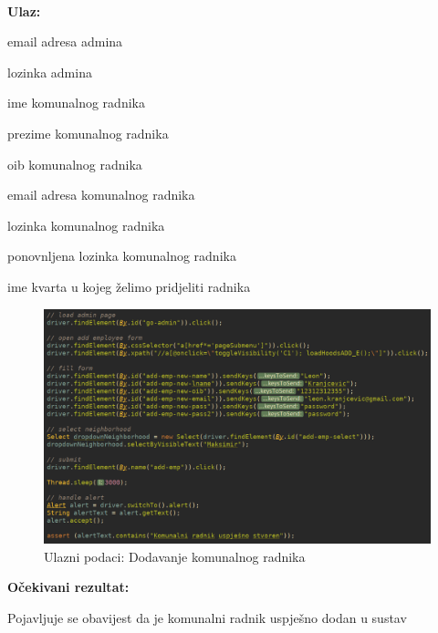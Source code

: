 			
			
			\noindent {}
			
			\
			
			\noindent \textbf{Ulaz:}
			
			\begin{packed_enum}
				\item email adresa admina
				\item lozinka admina
				\item ime komunalnog radnika
				\item prezime komunalnog radnika	
				\item oib komunalnog radnika		
				\item email adresa komunalnog radnika
				\item lozinka komunalnog radnika
				\item ponovnljena lozinka komunalnog radnika
				\item ime kvarta u kojeg želimo pridjeliti radnika
				
			\end{packed_enum}

			\begin{figure}[H]
					\includegraphics[scale=0.57]{figures/admin-add-emp-code.PNG}
					\centering
					\caption{Ulazni podaci: Dodavanje komunalnog radnika}
					\label{fig:Dodavanje komunalnog radnika}
				\end{figure}	
			
			\noindent \textbf{Očekivani rezultat:}
				\begin{packed_enum}
				\item Pojavljuje se obavijest da je komunalni radnik uspješno dodan u sustav
							
				
			\end{packed_enum}
			
